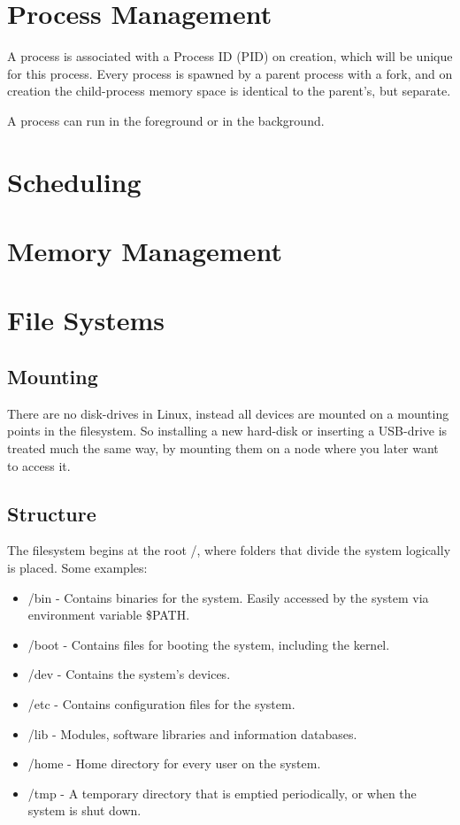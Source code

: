 \documentclass[12pt]{article}
\begin{document}
\section{Process Management} %
A process is associated with a Process ID (PID) on creation, which will be unique for this process. 
Every process is spawned by a parent process with a fork, 
and on creation the child-process memory space is identical to the parent's, but separate.

A process can run in the foreground or in the background.

\section{Scheduling} %

\section{Memory Management} %

\section{File Systems} %

\subsection{Mounting}
There are no disk-drives in Linux, instead all devices are mounted on a mounting points in the filesystem. 
So installing a new hard-disk or inserting a USB-drive is treated much the same way,
 by mounting them on a node where you later want to access it.

\subsection{Structure}
  The filesystem begins at the root /, where folders that divide the system logically is placed. Some examples:
  \begin{itemize}
    \item /bin - Contains binaries for the system. Easily accessed by the system via environment variable \$PATH.
    \item /boot - Contains files for booting the system, including the kernel.
    \item /dev - Contains the system's devices.
    \item /etc - Contains configuration files for the system.
    \item /lib - Modules, software libraries and information databases.
    \item /home - Home directory for every user on the system. 
    \item /tmp - A temporary directory that is emptied periodically, or when the system is shut down.
  \end{itemize}
 
\end{document}
